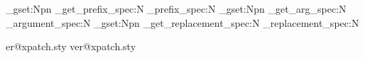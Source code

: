 
\usepackage{etoolbox}
\usepackage{letltxmacro}

\usepackage{expl3}
\usepackage{xparse}

\usepackage{iftex}


\usepackage{regexpatch}

\makeatletter
\ExplSyntaxOn

  {} %
  {
      {
        \cs_gset:Npn \token_get_prefix_spec:N { \cs_prefix_spec:N }
        \cs_gset:Npn \token_get_arg_spec:N { \cs_argument_spec:N }
        \cs_gset:Npn \token_get_replacement_spec:N { \cs_replacement_spec:N }
      }
      {} %
  }
\ExplSyntaxOff
\makeatother

\makeatletter
{}
    {\expandafter\xdef\csname ver@xpatch.sty}
    {\expandafter\xdef\csname ver@xpatch.sty}
\makeatother

